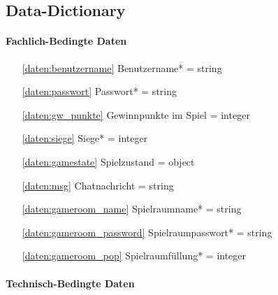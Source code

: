 \subsection{Data-Dictionary}

\paragraph{Fachlich-Bedingte Daten}

\begin{itemize}
\item[\ref{daten:benutzername}] Benutzername* = string
\item[\ref{daten:passwort}] Passwort* = string
\item[\ref{daten:gw_punkte}] Gewinnpunkte im Spiel = integer
\item[\ref{daten:siege}] Siege* = integer
\item[\ref{daten:gamestate}] Spielzustand = object
\item[\ref{daten:msg}] Chatnachricht = string
\item[\ref{daten:gameroom_name}] Spielraumname* = string
\item[\ref{daten:gameroom_password}] Spielraumpasswort* = string
\item[\ref{daten:gameroom_pop}] Spielraumfüllung* = integer
\end{itemize}

\paragraph{Technisch-Bedingte Daten}

\setcounter{pd}{10}

